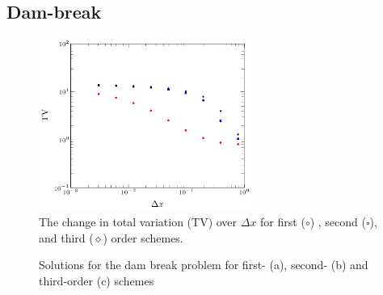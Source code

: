 \documentclass[SingleSpace,12pt]{Serre_ASCE}
\begin{document}
\subsection{Dam-break}
\begin{figure}[htb]
\begin{center}
\includegraphics[width=7.0cm]{./results/dambreak/L1con/both-figure0.pdf}
\end{center}
\caption{The change in total variation (TV) over $\Delta x$ for first ($\circ$) , second ($\square$), and third ($\diamond$) order schemes.}
\label{fig:DBL1}
\end{figure}
\begin{figure}[htb]
\centering
{}
\caption{Solutions for the dam break problem for first- (a), second- (b) and third-order (c) schemes}
\label{fig:DB}
\end{figure}
\end{document}
